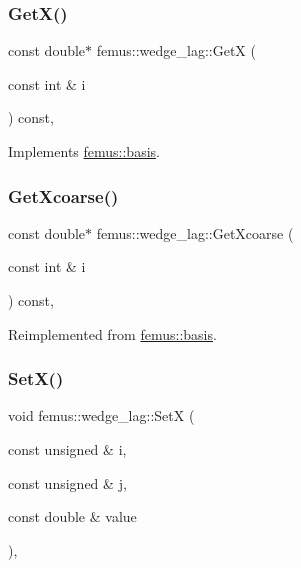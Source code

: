 \subsubsection{\texorpdfstring{Get\+X()}{GetX()}}
{\footnotesize\ttfamily const double$\ast$ femus\+::wedge\+\_\+lag\+::\+GetX (\begin{DoxyParamCaption}\item[{const int \&}]{i }\end{DoxyParamCaption}) const\hspace{0.3cm}{\ttfamily [inline]}, {\ttfamily [virtual]}}



Implements \mbox{\hyperlink{classfemus_1_1basis_a00597122bbc75877f1c184f8fce4986c}{femus\+::basis}}.

\mbox{\label{classfemus_1_1wedge__lag_a3cd96af653ca43643e6fd8a7a53cda07}} 
\subsubsection{\texorpdfstring{Get\+Xcoarse()}{GetXcoarse()}}
{\footnotesize\ttfamily const double$\ast$ femus\+::wedge\+\_\+lag\+::\+Get\+Xcoarse (\begin{DoxyParamCaption}\item[{const int \&}]{i }\end{DoxyParamCaption}) const\hspace{0.3cm}{\ttfamily [inline]}, {\ttfamily [virtual]}}



Reimplemented from \mbox{\hyperlink{classfemus_1_1basis_afcabbbda61ede8f30158fe08ee0a5258}{femus\+::basis}}.

\mbox{\label{classfemus_1_1wedge__lag_ad022f16d731698ddaeb7113d01e588cb}} 
\subsubsection{\texorpdfstring{Set\+X()}{SetX()}}
{\footnotesize\ttfamily void femus\+::wedge\+\_\+lag\+::\+SetX (\begin{DoxyParamCaption}\item[{const unsigned \&}]{i,  }\item[{const unsigned \&}]{j,  }\item[{const double \&}]{value }\end{DoxyParamCaption})\hspace{0.3cm}{\ttfamily [inline]}, {\ttfamily [virtual]}}



